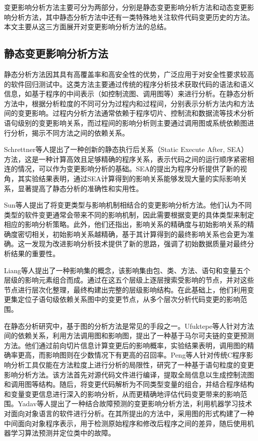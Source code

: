 变更影响分析方法主要可分为两部分，分别是静态变更影响分析方法和动态变更影响分析方法，其中静态分析方法中还有一类特殊地关注软件代码变更历史的方法。本文主要从这三方面展开对变更影响分析方法的总结。


\subsection{静态变更影响分析方法}

静态分析方法因其具有高覆盖率和高安全性的优势，广泛应用于对安全性要求较高的软件回归测试中。这类方法主要通过传统的程序分析技术获取代码的语法和语义信息，如基于程序的中间表示（如控制流图、调用图等）来进行分析。在静态分析方法中，根据分析粒度的不同可分为过程内和过程间，分别表示分析方法内和方法间的变更影响。过程内分析方法通常依赖于程序切片、控制流和数据流等技术\cite{2004Efficient,1991Using}分析语句级别的变更影响关系，而过程间的影响分析则主要通过调用图或系统依赖图进行分析，揭示不同方法之间的依赖关系\cite{JitenderKumarChhabra2018Improved, 2011An, 2013Analyzing}。

Schrettner等人\cite{Department2013Impact}提出了一种创新的静态执行后关系（Static Execute After, SEA）方法，这是一种计算高效且足够精确的程序关系，表示代码之间的运行顺序紧密相连的情况，可以作为变更影响分析的基础。SEA的提出为程序分析提供了新的视角，其实验结果表明，通过SEA计算得到的影响关系能够发现大量的实际影响关系，显著提高了静态分析的准确性和实用性。

Sun等人\cite{5676283}提出了将变更类型与影响机制相结合的变更影响分析方法。他们认为不同类型的软件变更通常会带来不同的影响机制，因此需要根据变更的具体类型来制定相应的影响分析策略。此外，他们还指出，影响关系的精确度与初始影响关系的精确度密切相关，初始影响关系越精确，基于其计算得到的最终影响关系也会更为准确。这一发现为改进影响分析技术提供了新的思路，强调了初始数据质量对最终分析结果的重要性。

Liang等人\cite{10430003}提出了一种影响集的概念，该影响集由包、类、方法、语句和变量五个层级的影响元素组合而成。通过在这五个层级上逐层搜索受影响的节点，并对这些节点进行层次化整理，最终构建出完整的层级影响结构。在此基础上，他们利用变更集定位子语句级依赖关系图中的变更节点，从多个层次分析代码变更的影响范围。

在静态分析研究中，基于图的分析方法是常见的手段之一。Ufuktepe等人\cite{2021Code}针对方法间的依赖关系，利用方法调用图和影响图，提出了一种基于马尔可夫链的变更预测方法。他们通过前向切片信息计算变更后的影响概率，实验结果表明，调用图的精确率更高，而影响图则在少数情况下有更高的召回率。Peng等人\cite{2022An}针对传统C程序影响分析工具仅能在方法粒度上进行分析的局限性，研究了一种基于语句粒度的变更影响分析方法。该方法首先对源代码文件进行编译，提取全局信息以生成控制流图和调用图等结构。随后，将变更代码解析为不同类型变量的组合，并结合程序结构和变量变更信息进行深入的影响分析，从而更精确地评估代码变更带来的影响范围。Yadav\cite{2022CIAFP}等人提出了一种结合故障预测的变更影响分析方法，利用机器学习技术对面向对象语言的软件进行分析。在其所提出的方法中，采用图的形式构建了一种中间面向对象程序表示，用于检测原始程序和修改后程序之间的差异，随后使用机器学习算法预测并定位类中的故障。

